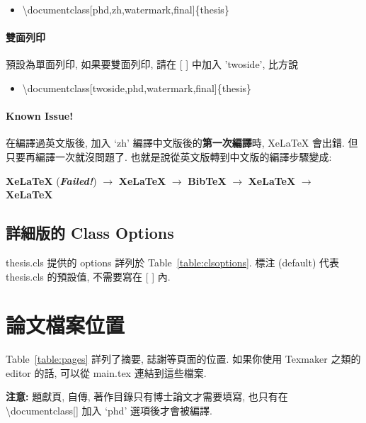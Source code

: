 \begin{itemize}
\item \textbackslash documentclass[phd,zh,watermark,final]\{thesis\}
\end{itemize}

\paragraph{雙面列印} 預設為單面列印, 如果要雙面列印, 請在 [ ] 中加入 'twoside', 比方說

\begin{itemize}
\item \textbackslash documentclass[twoside,phd,watermark,final]\{thesis\}
\end{itemize}

\paragraph{Known Issue!} 在編譯過英文版後, 加入 `zh' 編譯中文版後的\textbf{第一次編譯}時, XeLaTeX 會出錯.
但只要再編譯一次就沒問題了.
也就是說從英文版轉到中文版的編譯步驟變成:

\hspace{2em} \textbf{XeLaTeX} (\textbf{\textit{Failed!}}) $\rightarrow$ \textbf{XeLaTeX} $\rightarrow$ \textbf{BibTeX} $\rightarrow$ \textbf{XeLaTeX} $\rightarrow$ \textbf{XeLaTeX}

\subsection{詳細版的 Class Options}

thesis.cls 提供的 options 詳列於 Table~\ref{table:clsoptions}.
標注 (default) 代表 thesis.cls 的預設值, 不需要寫在 [ ] 內.



\section{論文檔案位置}

Table~\ref{table:pages} 詳列了摘要, 誌謝等頁面的位置.
如果你使用 Texmaker 之類的 editor 的話, 可以從 main.tex 連結到這些檔案.

\textbf{注意:} 題獻頁, 自傳, 著作目錄只有博士論文才需要填寫, 也只有在 \textbackslash documentclass[] 加入 `phd' 選項後才會被編譯.



